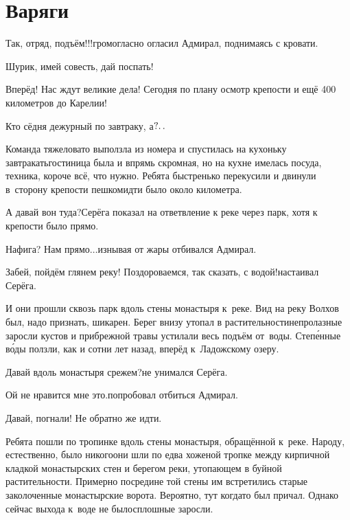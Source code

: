 \chapter{Варяги}
\vepsianrose
\fancyhead[LE]{\fancyplain{}{\bfseries \parttitle}}
\fancyhead[RO]{\fancyplain{}{\bfseries \rightmark}}

\diagdash Так, отряд, подъём!!!\mdash громогласно огласил Адмирал, поднимаясь с кровати.

\diagdash Шурик, имей совесть, дай поспать!

\diagdash Вперёд! Нас ждут великие дела! Сегодня по плану осмотр крепости и ещё 400 километров до Карелии!

\diagdash Кто сёдня дежурный по завтраку, а$\mathpunct{?\ldotp\ldotp}$%

Команда тяжеловато выползла из номера и спустилась на кухоньку завтракать\mdash гостиница была и впрямь скромная, но на кухне имелась посуда, техника, короче всё, что нужно. Ребята быстренько перекусили и двинули в~сторону крепости пешком\mdash идти было около километра.

\diagdash А давай вон туда?\mdash Серёга показал на ответвление к реке через парк, хотя к крепости было прямо.

\diagdash Нафига? Нам прямо$\ldots$\mdash изнывая от жары отбивался Адмирал.

\diagdash Забей, пойдём глянем реку! Поздороваемся, так сказать, с водой!\mdash настаивал Серёга.

И они прошли сквозь парк вдоль стены монастыря к~реке. Вид на реку Волхов был, надо признать, шикарен. Берег внизу утопал в растительности\mdash непролазные заросли кустов и прибрежной травы устилали весь подъём от~воды. Степ\'{е}нные в\'{о}ды ползли, как и сотни лет назад, вперёд к~Ладожскому озеру.

\diagdash Давай вдоль монастыря срежем?\mdash не унимался Серёга.

\diagdash Ой не нравится мне это.\mdash попробовал отбиться Адмирал.

\diagdash Давай, погнали! Не обратно же идти.

Ребята пошли по тропинке вдоль стены монастыря, обращённой к~реке. Народу, естественно, было никого\mdash они шли по едва хоженой тропке между кирпичной кладкой монастырских стен и берегом реки, утопающем в буйной растительности. Примерно посредине той стены им встретились старые заколоченные монастырские ворота. Вероятно, тут когда\sdash то был причал. Однако сейчас выхода к~воде не было\mdash сплошные заросли. 

